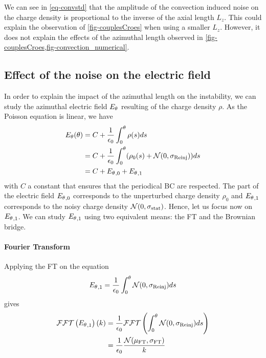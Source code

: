     We can see in \cref{eq-convstd} that the amplitude of the convection induced noise on the charge density is proportional to the inverse of the axial length $L_z$.
    This could explain the observation of \cref{fig-couplesCroes} when using a smaller $L_z$.
    However, it does not explain the effects of the azimuthal length observed in \cref{fig-couplesCroes,fig-convection_numerical}.

  \subsection{Effect of the noise on the electric field}
    \label{sec-mathnoise}
    In order to explain the impact of the azimuthal length on the instability, we can study the azimuthal electric field ${E_{\theta}}$ resulting of the charge density $\rho$.
    As the Poisson equation is linear, we have
    \begin{align}
      {\ensuremath{E_{\theta}}}(\theta) &= C + \frac{1}{\epsilon_0} \int_0^{\theta} \rho(s) ds\\
                    &= C + \frac{1}{\epsilon_0} \int_0^{\theta} (\rho_0(s) + \mathcal{N}(0, \sigma_{\rm Reinj}) ) ds \\ 
                    &= C + {E_{\theta}}_{, 0} + {E_{\theta}}_{, 1}
    \end{align}
    with $C$ a constant that ensures that the periodical \ac{BC} are respected.
    The part of the electric field ${E_{\theta}}_{, 0}$ corresponds to the unperturbed charge density $\rho_0$ and ${E_{\theta}}_{, 1}$  corresponds to the noisy charge density $\mathcal{N}(0, \sigma_{\rm stat})$.
    Hence, let us focus now on ${E_{\theta}}_{, 1}$.
    We can study ${E_{\theta}}_{, 1}$ using two equivalent means\string: the \ac{FT} and the Brownian bridge.
    
    \paragraph{Fourier Transform \\}
      Applying the \ac{FT} on the equation
      \begin{equation} \label{eq-aziE1}
        {\ensuremath{E_{\theta}}}_{, 1} = \frac{1}{\epsilon_0} \int_0^{\theta}  \mathcal{N}(0, \sigma_{\rm Reinj}) ds
      \end{equation}
      gives    
      \begin{align}
         \mathcal{FFT} \left( {E_{\theta}}_{, 1} \right) (k) &= \frac{1}{\epsilon_0}  \mathcal{FFT} \left( \int_0^{\theta}  \mathcal{N}(0, \sigma_{\rm Reinj}) ds \right) \\
                                     &= \frac{1}{\epsilon_0} \frac{ \mathcal{N}(\mu_{\rm FT}, \sigma_{\rm FT})}{k} \label{eq-fft}
      \end{align}
      
